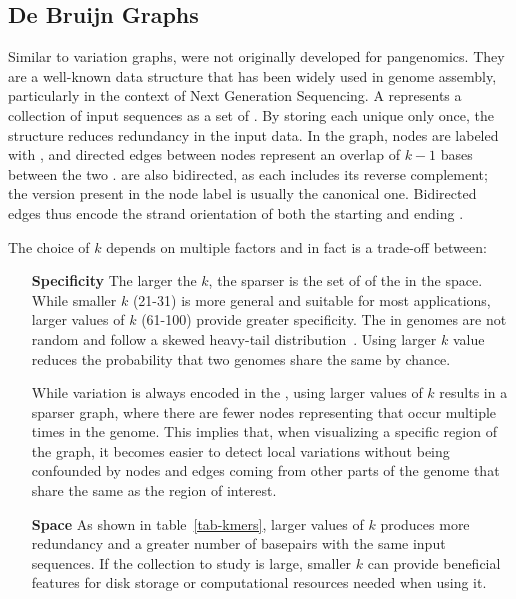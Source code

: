 \subsection{De Bruijn Graphs}
\label{sec:dbg_intro}
Similar to variation graphs,  \dbgs were not originally developed for pangenomics. They are a well-known data structure that has been widely used in genome assembly, particularly in the context of Next Generation Sequencing.
A \dbg represents a collection of input sequences as a set of \kmers. By storing each unique \kmer only once, the structure reduces redundancy in the input data. In the graph, nodes are labeled with \kmers, and directed edges between nodes represent an overlap of $k-1$ bases between the two \kmers. \dbgs are also bidirected, as each \kmer includes its reverse complement; the version present in the node label is usually the canonical one. Bidirected edges thus encode the strand orientation of both the starting and ending \kmers.

The choice of $k$ depends on multiple factors and in fact is a trade-off between: 
\begin{itemize}[leftmargin=1.8cm]
	\item[\textbf{Specificity}] The larger the $k$, the sparser is the set of \kmers of the \dbg in the space. While smaller $k$ (21-31) is more general and suitable for most applications, larger values of $k$ (61-100) provide greater specificity. The \kmers in genomes are not random and follow a skewed heavy-tail distribution~\cite{chor2009genomic}. Using larger $k$ value reduces the probability that two genomes share the same \kmer by chance.
	\item[\smash{\stackunder{\textbf{Variation}}{\textbf{resolution}}}]While variation is always encoded in the \dbg, using larger values of $k$ results in a sparser graph, where there are fewer nodes representing \kmers that occur multiple times in the genome. This implies that, when visualizing a specific region of the graph, it becomes easier to detect local variations without being confounded by nodes and edges coming from other parts of the genome that share the same \kmers as the region of interest.
	\item[\textbf{Space}] As shown in table~\ref{tab-kmers}, larger values of $k$ produces more redundancy and a greater number of basepairs with the same input sequences. If the collection to study is large, smaller $k$ can provide beneficial features for disk storage or computational resources needed when using it.
\end{itemize}
